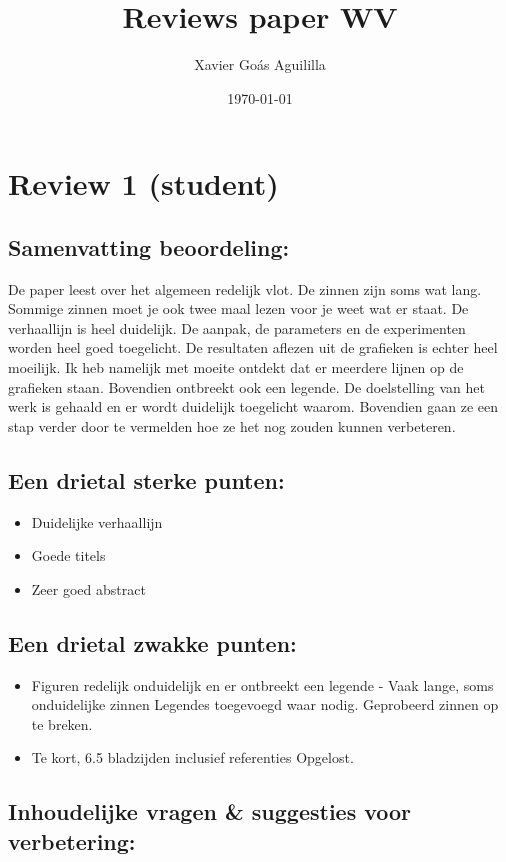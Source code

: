 \documentclass[11pt]{article}
\author{Xavier Goás Aguililla}
\date{\today}
\title{Reviews paper WV}
\begin{document}
\maketitle
\section{Review 1 (student)}

\subsection{Samenvatting beoordeling:}
De paper leest over het algemeen redelijk vlot. De zinnen zijn soms wat lang.
Sommige zinnen moet je ook twee maal lezen voor je weet wat er staat. De
verhaallijn is heel duidelijk. De aanpak, de parameters en de experimenten
worden heel goed toegelicht. De resultaten aflezen uit de grafieken is echter
heel moeilijk. Ik heb namelijk met moeite ontdekt dat er meerdere lijnen op de
grafieken staan. Bovendien ontbreekt ook een legende. De doelstelling van het
werk is gehaald en er wordt duidelijk toegelicht waarom. Bovendien gaan ze een
stap verder door te vermelden hoe ze het nog zouden kunnen verbeteren.

\subsection{Een drietal sterke punten:}

\begin{itemize}
\item Duidelijke verhaallijn
\item Goede titels
\item Zeer goed abstract
\end{itemize}

\subsection{Een drietal zwakke punten:}
\begin{itemize}
\item Figuren redelijk onduidelijk en er ontbreekt een legende - Vaak lange, soms onduidelijke zinnen {\color{red} Legendes toegevoegd waar nodig. Geprobeerd zinnen op te breken.}

\item Te kort, 6.5 bladzijden inclusief referenties {\color{red} Opgelost.}
\end{itemize}

\subsection{Inhoudelijke vragen \& suggesties voor verbetering:}
\end{document}

